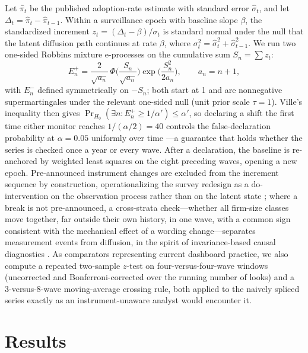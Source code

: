 \documentclass[preprint,12pt]{elsarticle}
\begin{document}
Let $\hat\pi_t$ be the published adoption-rate estimate with standard error $\hat\sigma_t$, and let $\Delta_t = \hat\pi_t - \hat\pi_{t-1}$. Within a surveillance epoch with baseline slope $\beta$, the standardized increment $z_t = (\Delta_t - \beta)/\sigma_t$ is standard normal under the null that the latent diffusion path continues at rate $\beta$, where $\sigma_t^2 = \hat\sigma_t^2 + \hat\sigma_{t-1}^2$. We run two one-sided Robbins mixture e-processes \citep{robbins1970} on the cumulative sum $S_n=\sum z_t$:
\begin{equation}
E_n^{+} = \frac{2}{\sqrt{a_n}}\,\Phi\!\Big(\frac{S_n}{\sqrt{a_n}}\Big)\exp\!\Big(\frac{S_n^2}{2a_n}\Big), \qquad a_n = n+1,
\label{eq:e}
\end{equation}
with $E_n^-$ defined symmetrically on $-S_n$; both start at 1 and are nonnegative supermartingales under the relevant one-sided null (unit prior scale $\tau=1$). Ville's inequality then gives $\Pr_{H_0}(\exists n: E_n^{+}\ge 1/\alpha')\le\alpha'$, so declaring a shift the first time either monitor reaches $1/(\alpha/2)=40$ controls the false-declaration probability at $\alpha=0.05$ uniformly over time \citep{ramdas2023}---a guarantee that holds whether the series is checked once a year or every wave. After a declaration, the baseline is re-anchored by weighted least squares on the eight preceding waves, opening a new epoch. Pre-announced instrument changes are excluded from the increment sequence by construction, operationalizing the survey redesign as a $\mathrm{do}$-intervention on the observation process rather than on the latent state \citep{pearl2009}; where a break is not pre-announced, a cross-strata check---whether all firm-size classes move together, far outside their own history, in one wave, with a common sign consistent with the mechanical effect of a wording change---separates measurement events from diffusion, in the spirit of invariance-based causal diagnostics \citep{peters2016}. As comparators representing current dashboard practice, we also compute a repeated two-sample $z$-test on four-versus-four-wave windows (uncorrected and Bonferroni-corrected over the running number of looks) and a 3-versus-8-wave moving-average crossing rule, both applied to the naively spliced series exactly as an instrument-unaware analyst would encounter it.

\section{Results}
\end{document}
